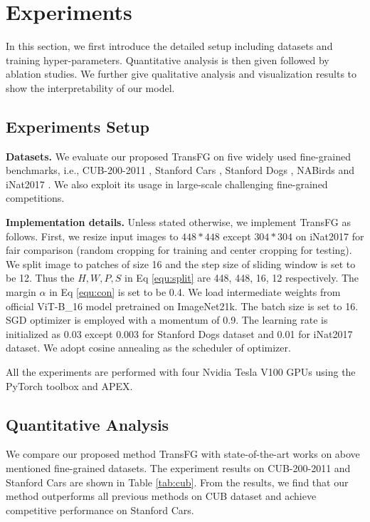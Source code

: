 \section{Experiments}
\label{sec:exp}

In this section, we first introduce the detailed setup including datasets and training hyper-parameters. Quantitative analysis is then given followed by ablation studies. We further give qualitative analysis and visualization results to show the interpretability of our model.

\subsection{Experiments Setup}
\label{sec:setup}

\textbf{Datasets.} We evaluate our proposed TransFG on five widely used fine-grained benchmarks, i.e., CUB-200-2011 \cite{WahCUB_200_2011}, Stanford Cars \cite{KrauseStarkDengFei-Fei_3DRR2013}, Stanford Dogs \cite{KhoslaYaoJayadevaprakashFeiFei_FGVC2011}, NABirds \cite{van2015building} and iNat2017 \cite{van2018inaturalist}. We also exploit its usage in large-scale challenging fine-grained competitions.

\noindent \textbf{Implementation details.}
Unless stated otherwise, we implement TransFG as follows. First, we resize input images to $448 * 448$ except $304 * 304$ on iNat2017 for fair comparison (random cropping for training and center cropping for testing). We split image to patches of size 16 and the step size of sliding window is set to be 12. Thus the $H, W, P, S$ in Eq \ref{equ:split} are 448, 448, 16, 12 respectively. The margin $\alpha$ in Eq \ref{equ:con} is set to be 0.4. We load intermediate weights from official ViT-B\_16 model pretrained on ImageNet21k. The batch size is set to 16. SGD optimizer is employed with a momentum of 0.9. The learning rate is initialized as 0.03 except 0.003 for Stanford Dogs dataset and 0.01 for iNat2017 dataset. We adopt cosine annealing as the scheduler of optimizer.

All the experiments are performed with four Nvidia Tesla V100 GPUs using the PyTorch toolbox and APEX.

\subsection{Quantitative Analysis}
\label{sec:quan}

We compare our proposed method TransFG with state-of-the-art works on above mentioned fine-grained datasets. The experiment results on CUB-200-2011 and Stanford Cars are shown in Table \ref{tab:cub}. From the results, we find that our method outperforms all previous methods on CUB dataset and achieve competitive performance on Stanford Cars.

